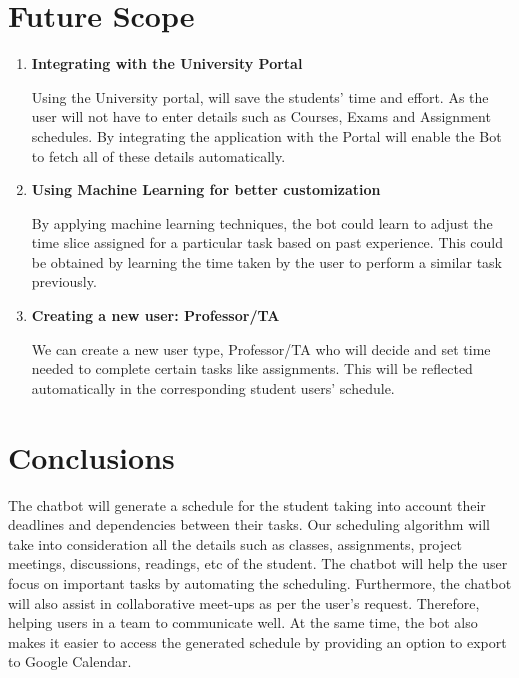 \documentclass{sig-alternate-05-2015}
\begin{document}
\section{Future Scope}

\begin{enumerate}
\item \textbf{Integrating with the University Portal}
\par
Using the University portal, will save the students' time and effort. As the user will not have to enter details such as Courses, Exams and Assignment schedules. By integrating the application with the Portal will enable the Bot to fetch all of these details automatically. 
\item \textbf{Using Machine Learning for better customization}
\par
By applying machine learning techniques, the bot could learn to adjust the time slice assigned for a particular task based on past experience. This could be obtained by learning the time taken by the user to perform a similar task previously.

\item \textbf{Creating a new user: Professor/TA}
\par
We can create a new user type, Professor/TA who will decide and set time needed to complete certain tasks like assignments. This will be reflected automatically in the corresponding student users' schedule.

\end{enumerate}

\section{Conclusions}
The chatbot will generate a schedule for the student taking into account their deadlines and dependencies between their tasks. Our scheduling algorithm will take into consideration all the details such as classes, assignments, project meetings, discussions, readings, etc of the student. The chatbot will help the user focus on important tasks by automating the scheduling. Furthermore, the chatbot will also assist in collaborative meet-ups as per the user's request. Therefore, helping users in a team to communicate well. 
At the same time, the bot also makes it easier to access the generated schedule by providing an option to export to Google Calendar.
\end{document}

